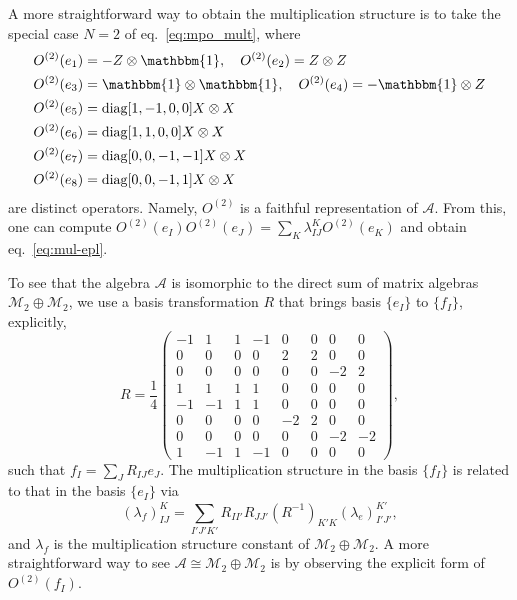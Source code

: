 \documentclass[prx, twocolumn, superscriptaddress, dvipsnames]{revtex4-2}
\theoremstyle{definition}
\newcommand{\bo}{\mathbbm{1}}
\newcommand{\mA}{\mathcal{A}}
\begin{document}
A more straightforward way to obtain the multiplication structure is to take the special case $N=2$ of eq.~\eqref{eq:mpo_mult}, where
\begin{equation}
\begin{aligned}
    &O^{(2)}(e_1)=-Z\otimes \bo,\quad O^{(2)}(e_2)=Z\otimes Z\\
    &O^{(2)}(e_3)=\bo\otimes\bo,\quad O^{(2)}(e_4)=-\bo\otimes Z\\
    &O^{(2)}(e_5)=\text{diag}[1,-1,0,0] X\otimes X\\
    &O^{(2)}(e_6)=\text{diag}[1,1,0,0] X\otimes X\\
    &O^{(2)}(e_7)=\text{diag}[0,0,-1,-1] X\otimes X\\
    &O^{(2)}(e_8)=\text{diag}[0,0,-1,1] X\otimes X
\end{aligned}
\end{equation}
are distinct operators. Namely, $O^{(2)}$ is a faithful representation of $\mA$. 
From this, one can compute $O^{(2)}(e_I) O^{(2)}(e_J)=\sum_K \lambda_{IJ}^K O^{(2)}(e_K)$ and obtain eq.~\eqref{eq:mul-epl}. 

To see that the algebra $\mA$ is isomorphic to the direct sum of matrix algebras $\mathcal{M}_2\oplus \mathcal{M}_2$, we use a basis transformation $R$ that brings basis $\{e_I\}$ to $\{f_I\}$, explicitly,
\begin{equation}
    R = \frac{1}{4}\begin{pmatrix}
        -1 & 1 & 1 & -1 & 0 & 0 & 0 & 0\\
        0 & 0 & 0 & 0 & 2 & 2 & 0 & 0\\
        0 & 0 & 0 & 0 & 0 & 0 & -2 & 2\\
        1 & 1 & 1 & 1 & 0 & 0 & 0 &0 \\
        -1 & -1 & 1 & 1 & 0 & 0 & 0 & 0\\
        0 & 0 & 0 & 0 & -2 & 2 & 0 & 0\\
        0 & 0 & 0 & 0 & 0 & 0 & -2 & -2\\
        1 & -1 & 1 & -1 & 0 & 0 & 0 & 0
    \end{pmatrix},
\end{equation}
such that $f_I = \sum_J R_{IJ} e_J$. The multiplication structure in the basis $\{f_I\}$ is related to that in the basis $\{e_I\}$ via
\begin{equation}
    (\lambda_f)_{IJ}^K= \sum_{I' J' K'} R_{II'} R_{JJ'} (R^{-1})_{K' K}(\lambda_e)_{I' J'}^{K'},
\end{equation}
and $\lambda_f$ is the multiplication structure constant of $\mathcal{M}_2\oplus \mathcal{M}_2$. A more straightforward way to see $\mA\cong \mathcal{M}_2\oplus \mathcal{M}_2$ is by observing the explicit form of $O^{(2)}(f_I)$. 
\end{document}
